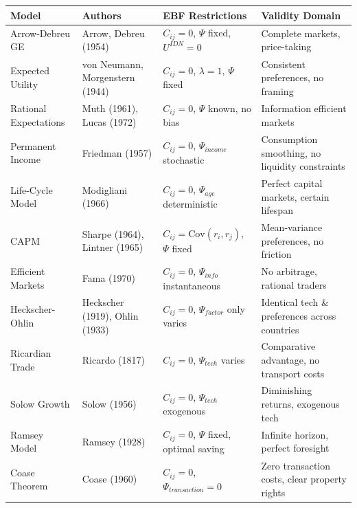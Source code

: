 \small
\begin{longtable}{@{}p{3cm}p{2.5cm}p{4cm}p{4cm}@{}}
\toprule
\textbf{Model} & \textbf{Authors} & \textbf{EBF Restrictions} & \textbf{Validity Domain} \\
\midrule
\endhead

Arrow-Debreu GE & Arrow, Debreu (1954) &
$C_{ij}=0$, $\Psi$ fixed, $U^{IDN}=0$ &
Complete markets, price-taking \\

Expected Utility & von Neumann, Morgenstern (1944) &
$C_{ij}=0$, $\lambda=1$, $\Psi$ fixed &
Consistent preferences, no framing \\

Rational Expectations & Muth (1961), Lucas (1972) &
$C_{ij}=0$, $\Psi$ known, no bias &
Information efficient markets \\

Permanent Income & Friedman (1957) &
$C_{ij}=0$, $\Psi_{income}$ stochastic &
Consumption smoothing, no liquidity constraints \\

Life-Cycle Model & Modigliani (1966) &
$C_{ij}=0$, $\Psi_{age}$ deterministic &
Perfect capital markets, certain lifespan \\

CAPM & Sharpe (1964), Lintner (1965) &
$C_{ij}=\text{Cov}(r_i,r_j)$, $\Psi$ fixed &
Mean-variance preferences, no friction \\

Efficient Markets & Fama (1970) &
$C_{ij}=0$, $\Psi_{info}$ instantaneous &
No arbitrage, rational traders \\

Heckscher-Ohlin & Heckscher (1919), Ohlin (1933) &
$C_{ij}=0$, $\Psi_{factor}$ only varies &
Identical tech \& preferences across countries \\

Ricardian Trade & Ricardo (1817) &
$C_{ij}=0$, $\Psi_{tech}$ varies &
Comparative advantage, no transport costs \\

Solow Growth & Solow (1956) &
$C_{ij}=0$, $\Psi_{tech}$ exogenous &
Diminishing returns, exogenous tech \\

Ramsey Model & Ramsey (1928) &
$C_{ij}=0$, $\Psi$ fixed, optimal saving &
Infinite horizon, perfect foresight \\

Coase Theorem & Coase (1960) &
$C_{ij}=0$, $\Psi_{transaction}=0$ &
Zero transaction costs, clear property rights \\

\bottomrule
\end{longtable}
\normalsize

